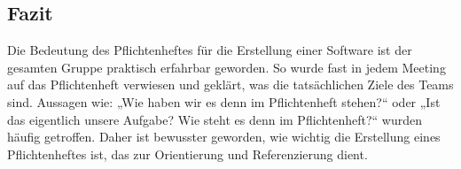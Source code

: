 \documentclass{scrartcl}
\begin{document}
\subsection{Fazit}
Die Bedeutung des Pflichtenheftes für die Erstellung einer Software ist der gesamten Gruppe praktisch erfahrbar geworden. So wurde fast in jedem Meeting auf das Pflichtenheft verwiesen und geklärt, was die tatsächlichen Ziele des Teams sind. Aussagen wie: „Wie haben wir es denn im Pflichtenheft stehen?“ oder „Ist das eigentlich unsere Aufgabe? Wie steht es denn im Pflichtenheft?“ wurden häufig getroffen. Daher ist bewusster geworden, wie wichtig die Erstellung eines Pflichtenheftes ist, das zur Orientierung und Referenzierung dient.
\end{document}
